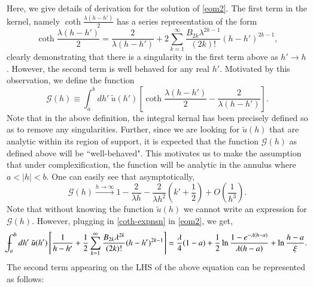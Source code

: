 \documentclass[3p,12pt]{elsarticle}
\numberwithin{equation}{section}
\begin{document}
Here, we give details of derivation for the solution of \eqref{eom2}. 
The first term in the kernel, namely $\coth \frac{\lambda(h-h')}{2}$ has a series representation of the form
\begin{equation}
\label{coth-expnsn}
\coth \frac{\lambda(h-h')}{2}=\frac{2}{\lambda(h-h')}+2\sum_{k=1}^{\infty}\frac{B_{2k}\lambda^{2k-1}}{(2k)!}(h-h')^{2k-1},
\end{equation}
clearly demonstrating that there is a singularity in the first term above as $h' \rightarrow h$. However, the second term is well behaved for any real $h'$. Motivated by this observation, we define the function
\begin{equation}
\label{G-defn}
\mathcal{G}(h) \equiv \int_a^b dh'\ \tilde{u}(h')\left[\coth \frac{\lambda(h-h')}{2}-\frac{2}{\lambda(h-h')}\right] .
\end{equation}
Note that in the above definition, the integral kernal has been precisely defined so as to remove any singularities. Further, since we are looking for $\tilde{u}(h)$ that are analytic within its region of support, it is expected that the function $\mathcal{G}(h)$ as defined above will be ``well-behaved". This motivates us to make the assumption that under complexification, the function will be analytic in the annulus where $a<|h|<b$. One can easily see that asymptotically, 
\begin{equation}
\mathcal{G}(h) \xrightarrow{h \to \infty} 1- \frac{2}{\lambda h} -\frac{2}{\lambda h^2}\left(k' +\frac{1}{2}\right)+O\left(\frac{1}{h^3}\right) .
\end{equation}
Note that without knowing the function $\tilde{u}(h)$ we cannot write an expression for $\mathcal{G}(h)$. However, plugging in \eqref{coth-expnsn} in \eqref{eom2}, we get,
\begin{equation}
\Xint-_{a}^{b} dh'\ \tilde{u}(h')\left[\frac{1}{h-h'}+\frac{1}{2}\sum_{k=1}^{\infty}\frac{B_{2k}\lambda^{2k}}{(2k)!}(h-h')^{2k-1}\right]=\frac{\lambda}{4}(1-a)+\frac{1}{2}\ln \frac{1-e^{-\lambda(h-a)}}{\lambda(h-a)}+\ln \frac{h-a}{\xi} .
\end{equation}
The second term appearing on the LHS of the above equation can be represented as follows:
\end{document}
